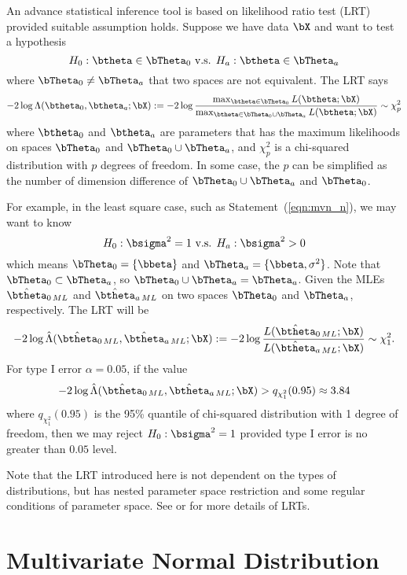 An advance statistical inference tool is based on likelihood ratio test
(LRT) provided suitable assumption
holds. Suppose we have data $\bX$ and want to test a hypothesis
$$
  H_0: \btheta \in \bTheta_0 \mbox{ v.s. }
  H_a: \btheta \in \bTheta_a
$$
where $\bTheta_0 \neq \bTheta_a$ that two spaces are not equivalent.
The LRT says
\begin{equation}
-2\log \Lambda(\btheta_0, \btheta_a; \bX) :=
-2\log
\frac{
\max_{\btheta\in\bTheta_0} L(\btheta; \bX)
}{
\max_{\btheta\in\bTheta_0\cup\bTheta_a} L(\btheta; \bX)
}
\sim \chi^2_p
\label{eqn:LRT}
\end{equation}
where $\btheta_0$ and $\btheta_a$ are parameters that has the maximum
likelihoods on spaces $\bTheta_0$ and $\bTheta_0\cup\bTheta_a$, and
$\chi^2_p$ is a chi-squared distribution
with $p$ degrees of freedom. In some case, the $p$ can be simplified as
the number of dimension difference of $\bTheta_0\cup\bTheta_a$ and
$\bTheta_0$.

For example,
in the least square case, such as Statement~(\ref{eqn:mvn_n}),
we may want to know
$$
  H_0: \bsigma^2 = 1 \mbox{ v.s. }
  H_a: \bsigma^2 > 0 
$$
which means $\bTheta_0 = \{\bbeta\}$ and $\bTheta_a = \{\bbeta, \sigma^2\}$.
Note that $\bTheta_0 \subset \bTheta_a$, so
$\bTheta_0 \cup \bTheta_a = \bTheta_a$.
Given the MLEs $\hat{\btheta}_{0\,ML}$ and $\hat{\btheta}_{a\,ML}$
on two spaces $\bTheta_0$ and $\bTheta_a$, respectively.
The LRT will be
$$
  -2\log \hat{\Lambda}(\hat{\btheta}_{0\,ML}, \hat{\btheta}_{a\,ML}; \bX) :=
  -2\log
  \frac{
    L(\hat{\btheta}_{0\,ML}; \bX)
  }{
    L(\hat{\btheta}_{a\,ML}; \bX)
  }
  \sim \chi^2_1.
$$
For type I error $\alpha = 0.05$, if
the value
$$
  -2\log \hat{\Lambda}(\hat{\btheta}_{0\,ML}, \hat{\btheta}_{a\,ML}; \bX)
  > q_{\chi^2_1}(0.95) \approx 3.84
$$
where $q_{\chi^2_1}(0.95)$ is the 95\% quantile of chi-squared distribution
with 1 degree of freedom, then
we may reject $H_0: \bsigma^2 = 1$ provided type I error is no greater
than $0.05$ level.

Note that the LRT introduced here is not dependent on the types of
distributions, but has nested parameter space restriction and some
regular conditions of parameter space.
See \citet{Casella2001} or \citet{Ferguson1996} for more details of LRTs.




\section{Multivariate Normal Distribution}
\label{sec:mvn}


